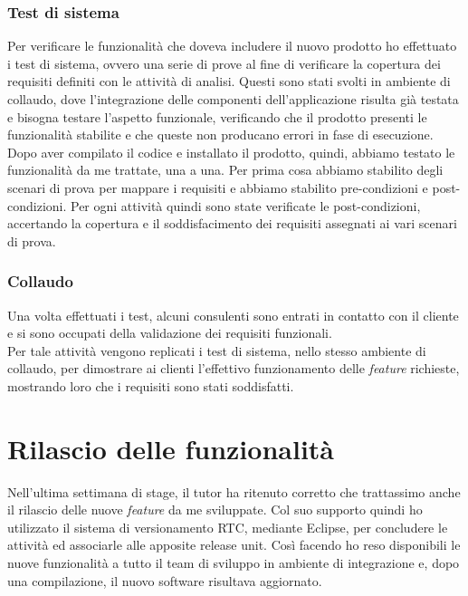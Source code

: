 	\subsubsection{Test di sistema}
	Per verificare le funzionalità che doveva includere il nuovo prodotto ho effettuato i test di sistema, ovvero una serie di prove al fine di verificare la copertura dei requisiti definiti con le attività di analisi. Questi sono stati svolti in ambiente di collaudo, dove l'integrazione delle componenti dell'applicazione risulta già testata e bisogna testare l'aspetto funzionale, verificando che il prodotto presenti le funzionalità stabilite e che queste non producano errori in fase di esecuzione.\\
	
	Dopo aver compilato il codice e installato il prodotto, quindi, abbiamo testato le funzionalità da me trattate, una a una. Per prima cosa abbiamo stabilito degli scenari di prova per mappare i requisiti e abbiamo stabilito pre-condizioni e post-condizioni. Per ogni attività quindi sono state verificate le post-condizioni, accertando la copertura e il soddisfacimento dei requisiti assegnati ai vari scenari di prova.
	
	\subsubsection{Collaudo}
	Una volta effettuati i test, alcuni consulenti sono entrati in contatto con	il cliente e si sono occupati della validazione dei requisiti funzionali.\\
	
	Per tale attività vengono replicati i test di sistema, nello stesso ambiente di collaudo, per dimostrare ai clienti l'effettivo funzionamento delle \textit{feature} richieste, mostrando loro che i requisiti sono stati soddisfatti.
	
\section{Rilascio delle funzionalità}

Nell'ultima settimana di stage, il tutor ha ritenuto corretto che trattassimo anche il rilascio delle nuove \textit{feature} da me sviluppate. Col suo supporto quindi ho utilizzato il sistema di versionamento RTC, mediante Eclipse, per concludere le attività ed associarle alle apposite release unit. Così facendo ho reso disponibili le nuove funzionalità a tutto il team di sviluppo in ambiente di integrazione e, dopo una compilazione, il nuovo software risultava aggiornato.

